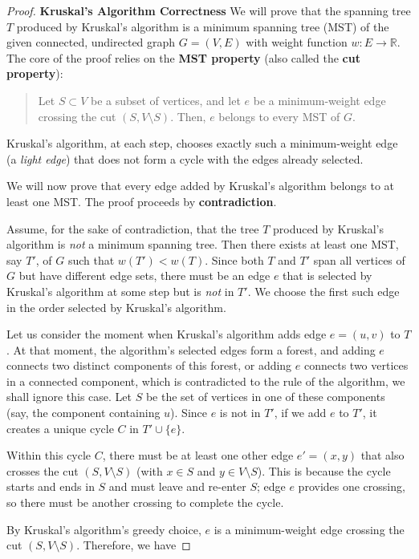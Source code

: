 \documentclass[oneside]{book}
\begin{document}
\begin{proof}
\textbf{Kruskal's Algorithm Correctness}
We will prove that the spanning tree $T$ produced by Kruskal's algorithm is a minimum spanning tree (MST) of the given connected, undirected graph $G=(V,E)$ with weight function $w: E \rightarrow \mathbb{R}$.
The core of the proof relies on the \textbf{MST property} (also called the \textbf{cut property}):
\begin{quote}
Let $S \subset V$ be a subset of vertices, and let $e$ be a minimum-weight edge crossing the cut $(S, V \setminus S)$. Then, $e$ belongs to every MST of $G$.
\end{quote}
Kruskal's algorithm, at each step, chooses exactly such a minimum-weight edge (a \emph{light edge}) that does not form a cycle with the edges already selected.

We will now prove that every edge added by Kruskal's algorithm belongs to at least one MST. The proof proceeds by \textbf{contradiction}.

Assume, for the sake of contradiction, that the tree $T$ produced by Kruskal's algorithm is \emph{not} a minimum spanning tree. Then there exists at least one MST, say $T'$, of $G$ such that $w(T') < w(T)$. Since both $T$ and $T'$ span all vertices of $G$ but have different edge sets, there must be an edge $e$ that is selected by Kruskal's algorithm at some step but is \emph{not} in $T'$. We choose the first such edge in the order selected by Kruskal's algorithm.

Let us consider the moment when Kruskal's algorithm adds edge $e = (u,v)$ to $T$. At that moment, the algorithm's selected edges form a forest, and adding $e$ connects two distinct components of this forest, or adding $e$ connects two vertices in a connected component, which is contradicted to the rule of the algorithm, we shall ignore this case. Let $S$ be the set of vertices in one of these components (say, the component containing $u$). Since $e$ is not in $T'$, if we add $e$ to $T'$, it creates a unique cycle $C$ in $T' \cup \{e\}$.

Within this cycle $C$, there must be at least one other edge $e' = (x,y)$ that also crosses the cut $(S, V \setminus S)$ (with $x \in S$ and $y \in V \setminus S$). This is because the cycle starts and ends in $S$ and must leave and re-enter $S$; edge $e$ provides one crossing, so there must be another crossing to complete the cycle.

By Kruskal's algorithm's greedy choice, $e$ is a minimum-weight edge crossing the cut $(S, V \setminus S)$. Therefore, we have


\end{proof}
\end{document}
